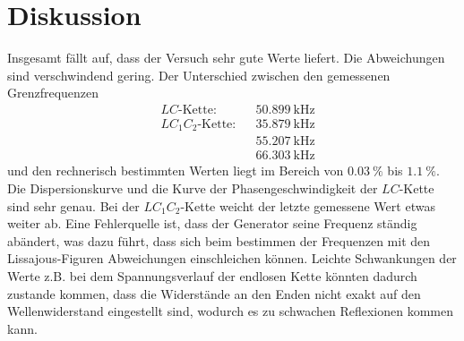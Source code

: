 \documentclass[
  bibliography=totoc,     %
  captions=tableheading,  %
  titlepage=firstiscover, %
]{scrartcl}
\begin{document}
\section{Diskussion}
\label{sec:diskussion}
Insgesamt fällt auf, dass der Versuch sehr gute Werte liefert. Die Abweichungen
sind verschwindend gering. Der Unterschied zwischen den gemessenen Grenzfrequenzen
\begin{align}
  &LC\text{-Kette:} & &\SI{50.899}{\kilo\hertz}\\
  &LC_1C_2\text{-Kette:} & &\SI{35.879}{\kilo\hertz}\\
  & & &\SI{55.207}{\kilo\hertz}\\
  & & &\SI{66.303}{\kilo\hertz}
\end{align}
und den rechnerisch bestimmten Werten liegt im Bereich von $\SI{0.03}{\percent}$
bis $\SI{1.1}{\percent}$.\\

Die Dispersionskurve und die Kurve der Phasengeschwindigkeit der $LC$-Kette sind
sehr genau. Bei der $LC_1C_2$-Kette weicht der letzte gemessene Wert etwas weiter
ab. Eine Fehlerquelle ist, dass der Generator seine Frequenz ständig abändert, was
dazu führt, dass sich beim bestimmen der Frequenzen mit den Lissajous-Figuren
Abweichungen einschleichen können. Leichte Schwankungen der Werte z.B. bei dem
Spannungsverlauf der endlosen Kette könnten dadurch zustande kommen, dass die
Widerstände an den Enden nicht exakt auf den Wellenwiderstand eingestellt sind,
wodurch es zu schwachen Reflexionen kommen kann.
\clearpage
\nocite{*}
\printbibliography
\end{document}
